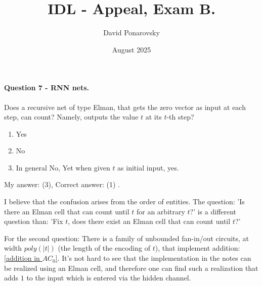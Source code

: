 \documentclass{article}
\title{IDL - Appeal, Exam B. }
\author{David Ponarovsky}
\date{August 2025}
\newcommand{\inb}[1]{ \color{blue}#1 \color{black} }
\begin{document}
\maketitle

\paragraph{ Question 7 - RNN nets.} 
Does a recursive net of type Elman, that gets the zero vector as input at each step, can count? Namely, outputs the value $t$ at its $t$-th step?
\begin{enumerate}
  \item Yes
  \item No
  \item In general No, Yet when given $t$ as initial input, yes. 
\end{enumerate}
\inb{ My answer: (3), Correct answer: (1)}. 




I believe that the confusion arises from the order of entities. The question: 'Is there an Elman cell that can count until $t$ for an arbitrary $t$?' is a different question than: 'Fix $t$, does there exist an Elman cell that can count until $t$?'

For the second question: There is a family of unbounded fan-in/out circuits, at width $poly(|t|)$ (the length of the encoding of $t$), that implement addition: \href{https://people.clarkson.edu/~alexis/PCMI/Notes/lectureB02.pdf}{[addition in $AC_{0}$]}. It's not hard to see that the implementation in the notes can be realized using an Elman cell, and therefore one can find such a realization that adds $1$ to the input which is entered via the hidden channel.
\end{document}

